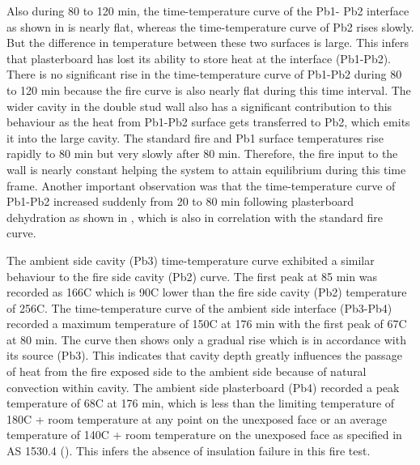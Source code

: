 Also during 80 to 120 min, the time-temperature curve of the Pb1- Pb2 interface as shown in  is nearly flat, whereas the time-temperature curve of Pb2 rises slowly. But the difference in temperature between these two surfaces is large. This infers that plasterboard has lost its ability to store heat at the interface (Pb1-Pb2). There is no significant rise in the time-temperature curve of Pb1-Pb2 during 80 to 120 min because the fire curve is also nearly flat during this time interval. The wider cavity in the double stud wall also has a significant contribution to this behaviour as the heat from Pb1-Pb2 surface gets transferred to Pb2, which emits it into the large cavity. The standard fire and Pb1 surface temperatures rise rapidly to 80 min but very slowly after 80 min. Therefore, the fire input to the wall is nearly constant helping the system to attain equilibrium during this time frame. Another important observation was that the time-temperature curve of Pb1-Pb2 increased suddenly from 20 to 80 min following plasterboard dehydration as shown in , which is also in correlation with the standard fire curve.

The ambient side cavity (Pb3) time-temperature curve exhibited a similar behaviour to the fire side cavity (Pb2) curve. The first peak at 85 min was recorded as 166\degree C which is 90\degree C lower than the fire side cavity (Pb2) temperature of 256\degree C. The time-temperature curve of the ambient side interface (Pb3-Pb4) recorded a maximum temperature of 150\degree C at 176 min with the first peak of 67\degree C at 80 min. The curve then shows only a gradual rise which is in accordance with its source (Pb3). This indicates that cavity depth greatly influences the passage of heat from the fire exposed side to the ambient side because of natural convection within cavity. The ambient side plasterboard (Pb4) recorded a peak temperature of 68\degree C at 176 min, which is less than the limiting temperature of 180\degree C + room temperature at any point on the unexposed face or an average temperature of 140\degree C + room temperature on the unexposed face as specified in AS 1530.4 (\cite{StandardsAustral2014}). This infers the absence of insulation failure in this fire test.

